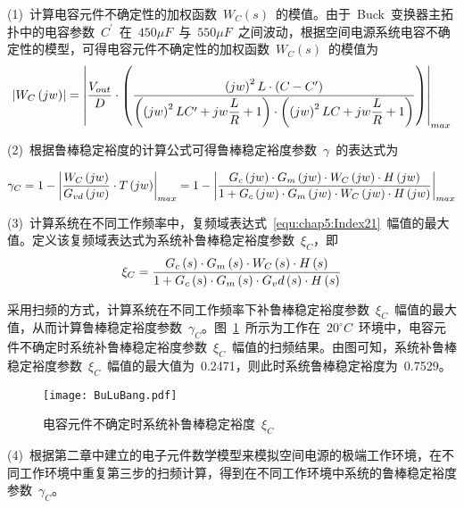 (1)~计算电容元件不确定性的加权函数~$W_C\left(s\right)$~的模值。由于~Buck~变换器主拓扑中的电容参数~$ C^{\prime}$~在~$450\mu F$~与~$550\mu F$~之间波动，根据空间电源系统电容不确定性的模型，可得电容元件不确定性的加权函数~$W_C\left(s\right)$~的模值为
\begin{equation}\label{equ:chap5:Index20}
\left|W_C\left(jw\right) \right|=\left|  \displaystyle\frac{V_{out}}{D}\cdot\left(\displaystyle\frac{\left(jw\right)^2L\cdot\left(C-C^{\prime}\right)}{\left(\left(jw\right)^2LC^{\prime}+jw\displaystyle\frac{L}{R}+1\right)\cdot\left(\left(jw\right)^2LC+jw\displaystyle\frac{L}{R}+1\right)}\right)
 \right|_{max }
\end{equation}

(2)~根据鲁棒稳定裕度的计算公式可得鲁棒稳定裕度参数~$\gamma$~的表达式为
\begin{small}
\begin{equation}\label{equ:chap5:Index21}
\gamma_C=1-\left|\displaystyle\frac{W_C\left(jw\right)}{G_{vd}\left(jw\right)}\cdot T\left(jw\right)\right|_{max}=1-\left|\displaystyle\frac{G_c\left(jw\right)\cdot G_m\left(jw\right)\cdot W_C\left(jw\right)\cdot H\left(jw\right)}{1+G_c\left(jw\right)\cdot G_m\left(jw\right)\cdot W_C\left(jw\right)\cdot H\left(jw\right)}\right|_{max}
\end{equation}
\end{small}

(3)~计算系统在不同工作频率中，复频域表达式~\ref{equ:chap5:Index21}~幅值的最大值。定义该复频域表达式为系统补鲁棒稳定裕度参数~$\xi_C$，即
\begin{equation}\label{equ:chap5:Index22}
\xi_C=\displaystyle\frac{G_c\left(s\right)\cdot G_m\left(s\right)\cdot W_C\left(s\right)\cdot H\left(s\right)}{1+G_c\left(s\right)\cdot G_m\left(s\right)\cdot G_vd\left(s\right)\cdot H\left(s\right)}
\end{equation}

采用扫频的方式，计算系统在不同工作频率下补鲁棒稳定裕度参数~$\xi_C$~幅值的最大值，从而计算鲁棒稳定裕度参数~$\gamma_C$。图~\ref{fig:chap5:bulingmin}~所示为工作在~$20^{\circ}C$~环境中，电容元件不确定时系统补鲁棒稳定裕度参数~$\xi_C$~幅值的扫频结果。由图可知，系统补鲁棒稳定裕度参数~$\xi_C$~幅值的最大值为~0.2471，则此时系统鲁棒稳定裕度为~0.7529。
\begin{figure}[h]
  \centering
      \texttt{[image: BuLuBang.pdf]}\\
  \caption{电容元件不确定时系统补鲁棒稳定裕度~$\xi_C$}\label{fig:chap5:bulingmin}
\end{figure}

(4)~根据第二章中建立的电子元件数学模型来模拟空间电源的极端工作环境，在不同工作环境中重复第三步的扫频计算，得到在不同工作环境中系统的鲁棒稳定裕度参数~$\gamma_C$。
